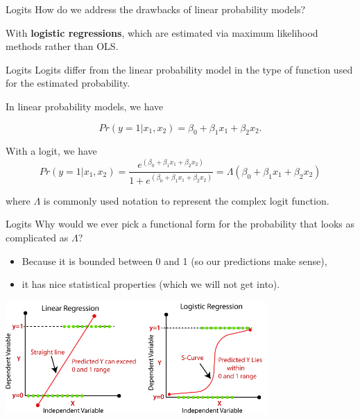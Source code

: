 \documentclass[
  ignorenonframetext,
]{beamer}
\begin{document}
\begin{frame}{Logits}
\protect\hypertarget{logits-1}{}
How do we address the drawbacks of linear probability models?

With \textbf{logistic regressions}, which are estimated via maximum
likelihood methods rather than OLS.
\end{frame}

\begin{frame}{Logits}
\protect\hypertarget{logits-2}{}
Logits differ from the linear probability model in the type of function
used for the estimated probability.

In linear probability models, we have

\[
Pr(y=1|x_1, x_2)=\beta_0+\beta_1x_1+\beta_2x_2.
\]

With a logit, we have \[
Pr(y=1|x_1, x_2)=\frac{e^{(\beta_0+\beta_1x_1+\beta_2x_2)}}{1+e^{(\beta_0+\beta_1x_1+\beta_2x_2)}}=\Lambda(\beta_0+\beta_1x_1+\beta_2x_2)
\]

where \(\Lambda\) is commonly used notation to represent the complex
logit function.
\end{frame}

\begin{frame}{Logits}
\protect\hypertarget{logits-3}{}
Why would we ever pick a functional form for the probability that looks
as complicated as \(\Lambda\)?

\begin{itemize}
\item
  Because it is bounded between 0 and 1 (so our predictions make sense),
\item
  it has nice statistical properties (which we will not get into).
\end{itemize}

\includegraphics[width=0.75\textwidth,height=\textheight]{"images/lin_v_log.png"}
\end{frame}
\end{document}
